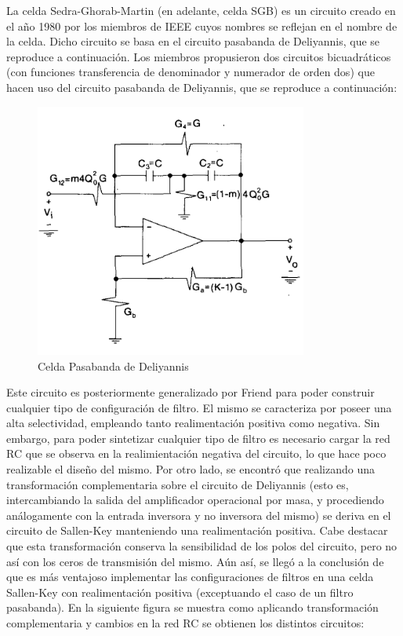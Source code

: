 La celda Sedra-Ghorab-Martin (en adelante, celda SGB) es un circuito creado en el año 1980 por los miembros de IEEE cuyos nombres se reflejan en el nombre de la celda. Dicho circuito se basa en el circuito pasabanda de Deliyannis, que se reproduce a continuación. Los miembros propusieron dos circuitos bicuadráticos (con funciones transferencia de denominador y numerador de orden dos) que hacen uso del circuito pasabanda de Deliyannis, que se reproduce a continuación:

\begin{figure}[h]
	\includegraphics[width=0.8\textwidth]{../Ejercicio2-DisenoDeCeldas/3CeldaSedra/Imagenes/Celda Deliyannis.png}
	\centering
	\caption{Celda Pasabanda de Deliyannis}
	\label{Deliyannis pasabanda}
\end{figure}

Este circuito es posteriormente generalizado por Friend para poder construir cualquier tipo de configuración de filtro. El mismo se caracteriza por poseer una alta selectividad, empleando tanto realimentación positiva como negativa. Sin embargo, para poder sintetizar cualquier tipo de filtro es necesario cargar la red RC que se observa en la realimientación negativa del circuito, lo que hace poco realizable el diseño del mismo. Por otro lado, se encontró que realizando una transformación complementaria sobre el circuito de Deliyannis (esto es, intercambiando la salida del amplificador operacional por masa, y procediendo análogamente con la entrada inversora y no inversora del mismo) se deriva en el circuito de Sallen-Key manteniendo una realimentación positiva. Cabe destacar que esta transformación conserva la sensibilidad de los polos del circuito, pero no así con los ceros de transmisión del mismo. Aún así, se llegó a la conclusión de que es más ventajoso implementar las configuraciones de filtros en una celda Sallen-Key con realimentación positiva (exceptuando el caso de un filtro pasabanda).
En la siguiente figura se muestra como aplicando transformación complementaria y cambios en la red RC se obtienen los distintos circuitos:

